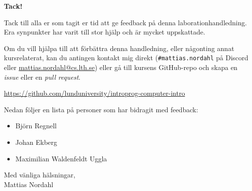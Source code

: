 \begin{center}
    \vspace*{1cm}
    \Large\textbf{Tack!}
    \vspace{0.5cm}
\end{center}

\noindent
Tack till alla er som tagit er tid att ge feedback på denna laborationhandledning. Era synpunkter har varit till stor hjälp och är mycket uppskattade.

\blankline

\noindent
Om du vill hjälpa till att förbättra denna handledning, eller någonting annat kursrelaterat, kan du antingen kontakt mig direkt (\texttt{\#mattias.nordahl} på Discord eller \url{mattias.nordahl@cs.lth.se}) eller gå till kursens GitHub-repo och skapa en \textit{issue} eller en \textit{pull request}.

\halfblankline

\url{https://github.com/lunduniversity/introprog-computer-intro}

\blankline

\noindent
Nedan följer en lista på personer som har bidragit med feedback:

\begin{itemize}[label={},itemsep=1mm,parsep=0mm]
    \item Björn Regnell
    \item Johan Ekberg
    \item Maximilian Waldenfeldt Uggla
\end{itemize}

\vspace{0.5cm}
\begin{flushright}
    Med vänliga hälsningar,\\
    Mattias Nordahl
\end{flushright}
